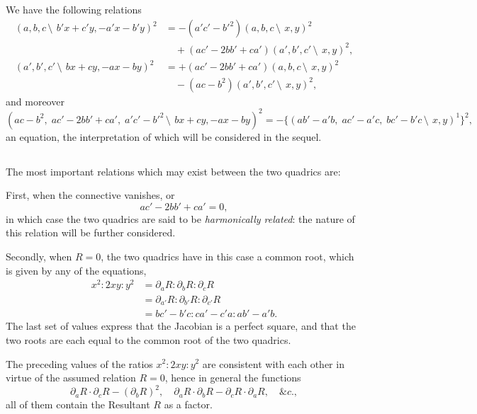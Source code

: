 \documentclass[12pt,a4paper]{article}
\begin{document}
\subsection{}

We have the following relations
\begin{align*}
(a, b, c\,\setminus\!\!\:\, b'x + c'y, -a'x - b'y)^2 &= -(a'c' - b'^2)(a, b, c\,\setminus\!\!\:\, x, y)^2\\
&\quad + (ac' - 2bb' + ca')(a', b', c'\,\setminus\!\!\:\, x, y)^2,\\
(a', b', c'\,\setminus\!\!\:\, bx + cy, -ax - by)^2 &= +(ac' - 2bb' + ca')(a, b, c\,\setminus\!\!\:\, x, y)^2\\
&\quad - (ac - b^2)(a', b', c'\,\setminus\!\!\:\, x, y)^2,
\end{align*}
and moreover
\[
(ac - b^2,\; ac' - 2bb' + ca',\; a'c' - b'^2\,\setminus\!\!\:\, bx + cy, -ax - by)^2 = -\{(ab' - a'b,\; ac' - a'c,\; bc' - b'c\,\setminus\!\!\:\, x, y)^1\}^2,
\]
an equation, the interpretation of which will be considered in the sequel.

\subsection{}

The most important relations which may exist between the two quadrics are:

First, when the connective vanishes, or
\[
ac' - 2bb' + ca' = 0,
\]
in which case the two quadrics are said to be \textit{harmonically related}: the nature of this relation will be further considered.

Secondly, when $R = 0$, the two quadrics have in this case a common root, which is given by any of the equations,
\begin{align*}
x^2 : 2xy : y^2 &= \partial_a R : \partial_b R : \partial_c R \\
&= \partial_{a'}R : \partial_{b'}R : \partial_{c'}R \\
&= bc' - b'c : ca' - c'a : ab' - a'b.
\end{align*}
The last set of values express that the Jacobian is a perfect square, and that the two roots are each equal to the common root of the two quadrics.

The preceding values of the ratios $x^2 : 2xy : y^2$ are consistent with each other in virtue of the assumed relation $R = 0$, hence in general the functions
\[
\partial_a R \cdot \partial_c R - (\partial_b R)^2, \quad \partial_a R \cdot \partial_b R - \partial_c R \cdot \partial_a R, \quad \&c.,
\]
all of them contain the Resultant $R$ as a factor.
\end{document}
